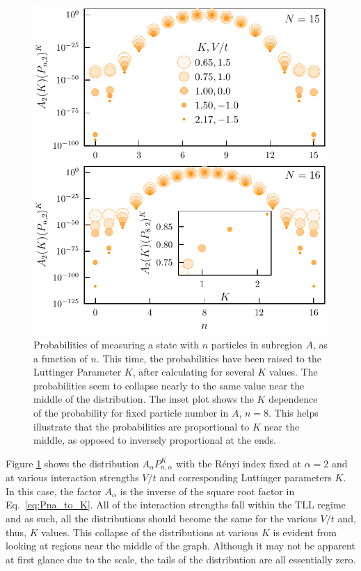 \begin{figure}[h!]
\begin{center}
\includegraphics[scale=1.0]{TLLCollapse.pdf}
\end{center}
\caption{Probabilities of measuring a state with $n$ particles in subregion $A$, as  a function of $n$. This time, the probabilities have been raised to the Luttinger Parameter $K$, after calculating for several $K$ values. The probabilities seem to collapse nearly to the same value near the middle of the distribution. The inset plot shows the $K$ dependence of the probability for fixed particle number in $A$, $n=8$. This helps illustrate that the probabilities are proportional to $K$ near the middle, as opposed to inversely proportional at the ends.}
\label{fig:K_collapse}
\end{figure}
 
Figure \ref{fig:K_collapse} shows the distribution $A_{\alpha} P_{n,\alpha}^{K}$ with the R\'enyi index fixed at $\alpha=2$ and at various interaction strengths $V/t$ and corresponding Luttinger parameters $K$. In this case, the factor $A_{\alpha}$ is the inverse of the square root factor in Eq.~\eqref{eq:Pna_to_K}. All of the interaction strengths fall within the TLL regime and as such, all the distributions should become the same for the various $V/t$ and, thus, $K$ values. This collapse of the distributions at various $K$ is evident from looking at regions near the middle of the graph. Although it may not be apparent at first glance due to the scale, the tails of the distribution are all essentially zero.

